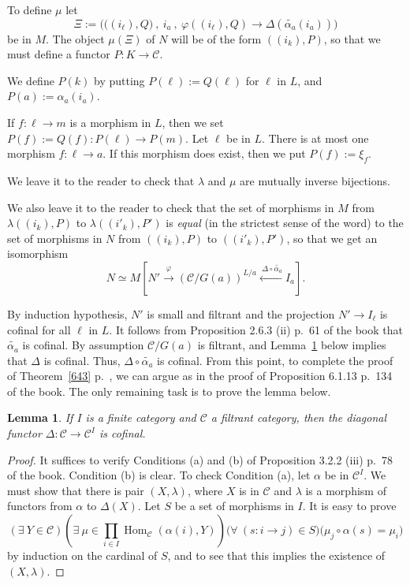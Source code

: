 \documentclass[12pt]{article}
\newtheorem{lem}[thm]{Lemma}
\theoremstyle{remark}
\theoremstyle{definition}
\newcommand{\C}{\mathcal C}
\newcommand{\pp}{\varphi}
\DeclareMathOperator{\Hom}{Hom}
\begin{document}
To define $\mu$ let 
$$
\Xi:=\Big(\big((i_\ell),Q\big)\ ,\ i_a\ ,\ \pp((i_\ell),Q)\to\Delta(\widetilde{\alpha_a}(i_a))\Big)
$$ 
be in $M$. The object $\mu(\Xi)$ of $N$ will be of the form $((i_k),P)$, so that we must define a functor $P:K\to\C$. 

We define $P(k)$ by putting $P(\ell):=Q(\ell)$ for $\ell$ in $L$, and $P(a):=\alpha_a(i_a)$. 

If $f:\ell\to m$ is a morphism in $L$, then we set $P(f):=Q(f):P(\ell)\to P(m)$. Let $\ell$ be in $L$. There is at most one morphism $f:\ell\to a$. If this morphism does exist, then we put $P(f):=\xi_f$. 

We leave it to the reader to check that $\lambda$ and $\mu$ are mutually inverse bijections. 

We also leave it to the reader to check that the set of morphisms in $M$ from $\lambda((i_k),P)$ to $\lambda((i'_k),P')$ is \emph{equal} (in the strictest sense of the word) to the set of morphisms in $N$ from $((i_k),P)$ to $((i'_k),P')$, so that we get an isomorphism 
$$ 
N\simeq M\left[N'\xrightarrow{\pp}(\C/G(a))^{L/a}\xleftarrow{\ \Delta\circ\widetilde{\alpha_a}}I_a\right]. 
$$

By induction hypothesis, $N'$ is small and filtrant and the projection $N'\to I_\ell$ is cofinal for all $\ell$ in $L$. It follows from Proposition 2.6.3 (ii) p.~61 of the book that $\widetilde{\alpha_a}$ is cofinal. By assumption $\C/G(a)$ is filtrant, and Lemma~\ref{delta} below implies that $\Delta$ is cofinal. Thus, $\Delta\circ\widetilde{\alpha_a}$ is cofinal. From this point, to complete the proof of Theorem~\ref{643} p.~\pageref{643}, we can argue as in the proof of Proposition 6.1.13 p.~134 of the book. The only remaining task is to prove the lemma below.

\begin{lem}\label{delta}
If $I$ is a finite category and $\C$ a filtrant category, then the diagonal functor $\Delta:\C\to\C^I$ is cofinal.
\end{lem}

\begin{proof}
It suffices to verify Conditions (a) and (b) of Proposition 3.2.2 (iii) p.~78 of the book. Condition (b) is clear. To check Condition (a), let $\alpha$ be in $\C^I$. We must show that there is pair $(X,\lambda)$, where $X$ is in $\C$ and $\lambda$ is a morphism of functors from $\alpha$ to $\Delta(X)$. Let $S$ be a set of morphisms in $I$. It is easy to prove 
$$
(\exists\ Y\in\C)\left(\exists\ \mu\in\prod_{i\in I}\Hom_\C(\alpha(i),Y)\right)\Big(\forall\ (s:i\to j)\in S\Big)\Big(\mu_{j}\circ\alpha(s)=\mu_i\Big) 
$$ 
by induction on the cardinal of $S$, and to see that this implies the existence of $(X,\lambda)$.
\end{proof}
\end{document}
